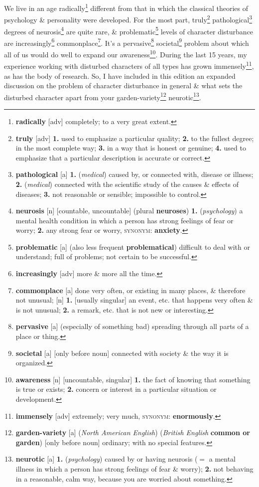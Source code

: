 \documentclass[oneside]{book}
\numberwithin{equation}{section}
\begin{document}
We live in an age radically\footnote{\textbf{radically} [adv] completely; to a very great extent.} different from that in which the classical theories of psychology \& personality were developed. For the most part, truly\footnote{\textbf{truly} [adv] \textbf{1.} used to emphasize a particular quality; \textbf{2.} to the fullest degree; in the most complete way; \textbf{3.} in a way that is honest or genuine; \textbf{4.} used to emphasize that a particular description is accurate or correct.} pathological\footnote{\textbf{pathological} [a] \textbf{1.} (\textit{medical}) caused by, or connected with, disease or illness; \textbf{2.} (\textit{medical}) connected with the scientific study of the causes \& effects of diseases; \textbf{3.} not reasonable or sensible; impossible to control.} degrees of neurosis\footnote{\textbf{neurosis} [n] [countable, uncountable] (plural \textbf{neuroses}) \textbf{1.} (\textit{psychology}) a mental health condition in which a person has strong feelings of fear or worry; \textbf{2.} any strong fear or worry, \textsc{synonym}: \textbf{anxiety}.} are quite rare, \& problematic\footnote{\textbf{problematic} [a] (also less frequent \textbf{problematical}) difficult to deal with or understand; full of problems; not certain to be successful.} levels of character disturbance are increasingly\footnote{\textbf{increasingly} [adv] more \& more all the time.} commonplace\footnote{\textbf{commonplace} [a] done very often, or existing in many places, \& therefore not unusual; [n] \textbf{1.} [usually singular] an event, etc. that happens very often \& is not unusual; \textbf{2.} a remark, etc. that is not new or interesting.}. It's a pervasive\footnote{\textbf{pervasive} [a] (especially of something bad) spreading through all parts of a place or thing.} societal\footnote{\textbf{societal} [a] [only before noun] connected with society \& the way it is organized.} problem about which all of us would do well to expand our awareness\footnote{\textbf{awareness} [n] [uncountable, singular] \textbf{1.} the fact of knowing that something is true or exists; \textbf{2.} concern or interest in a particular situation or development.}. During the last 15 years, my experience working with disturbed characters of all types has grown immensely\footnote{\textbf{immensely} [adv] extremely; very much, \textsc{synonym}: \textbf{enormously}.}, as has the body of research. So, I have included in this edition an expanded discussion on the problem of character disturbance in general \& what sets the disturbed character apart from your garden-variety\footnote{\textbf{garden-variety} [a] (\textit{North American English}) (\textit{British English} \textbf{common or garden}) [only before noun] ordinary; with no special features.} neurotic\footnote{\textbf{neurotic} [a] \textbf{1.} (\textit{psychology}) caused by or having neurosis ($=$ a mental illness in which a person has strong feelings of fear \& worry); \textbf{2.} not behaving in a reasonable, calm way, because you are worried about something.}.
\end{document}
